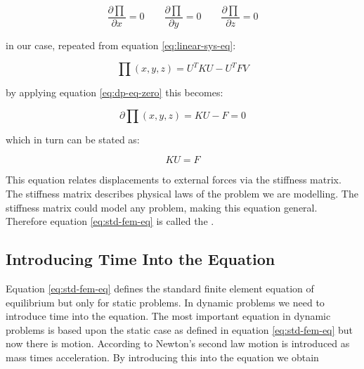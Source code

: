 

\begin{equation}
\label{eq:dp-eq-zero}
\frac{\partial \prod}{ \partial x} = 0
\qquad
\frac{\partial \prod}{ \partial y} = 0
\qquad
\frac{\partial \prod}{ \partial z} = 0
\end{equation}

in our case, repeated from equation \eqref{eq:linear-sys-eq}:

\begin{equation*}
\prod (x,y,z) = U^T K U - U^T F V
\end{equation*}

by applying equation \eqref{eq:dp-eq-zero} this becomes:

\begin{equation}
\partial \prod (x,y,z) = K U - F = 0
\end{equation}

which in turn can be stated as:

\begin{equation}
\label{eq:std-fem-eq}
K U = F
\end{equation}

This equation relates displacements to external forces via the
stiffness matrix. The stiffness matrix describes physical laws of the
problem we are modelling. The stiffness matrix could model any
problem, making this equation general. Therefore equation
\eqref{eq:std-fem-eq} is called the
.

\subsection{Introducing Time Into the Equation}
Equation \eqref{eq:std-fem-eq} defines the standard finite element
equation of equilibrium but only for static problems. In dynamic
problems we need to introduce time into the equation.
%
The most important equation in dynamic problems is based
upon the static case as defined in equation \eqref{eq:std-fem-eq} but now there
is motion. According to Newton's second law motion is introduced as mass times
acceleration. By introducing this into the equation we obtain 

